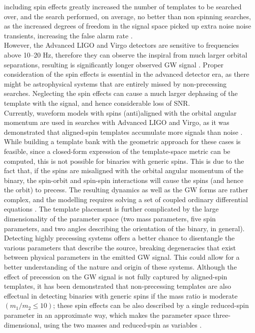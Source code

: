 \documentclass[binding=0.6cm, LaM]{sapthesis}
\begin{document}
	including spin effects greatly increased the number of templates to be searched over, 
	and the search performed, on average, no better than non spinning searches, 	
	as the increased degrees of freedom in the signal space picked up extra noise noise transients, 	
	increasing the false alarm rate \cite{32, 38}. \\ 
	However, the Advanced LIGO and Virgo detectors are sensitive to frequencies above 10–20 Hz, 
	therefore they can observe the inspiral from much larger orbital separations, 
	resulting is significantly longer observed GW signal \cite{23}. 
	Proper consideration of the spin effects is essential in the advanced detector era, 
	as there might be astrophysical systems that are entirely missed by non-precessing searches.
	Neglecting the spin effects can cause a much larger dephasing of the template with the signal, 
	and hence considerable loss of SNR. \\
	Currently, waveform models with spins (anti)aligned with the orbital angular momentum 
	are used in searches with Advanced LIGO and Virgo, 
	as it was demonstrated that aligned-spin templates accumulate more signals than noise \cite{27}. 
	While building a template bank with the geometric approach for these cases is feasible, 
	since a closed-form expression of the template-space metric can be computed, 
	this is not possible for binaries with generic spins. 
	This is due to the fact that, 
	if the spins are misaligned with the orbital angular momentum of the binary, 
	the spin-orbit and spin-spin interactions will cause the spins 
	(and hence the orbit) to precess. 
	The resulting dynamics as well as the GW forms are rather complex, 
	and the modelling requires solving a set of coupled ordinary differential equations \cite{39}. 
	The template placement is further complicated by the large dimensionality of the parameter space 
	(two mass parameters, five spin parameters, and two angles describing the orientation of the binary, in general). 
	Detecting highly precessing systems offers a better chance to 
	disentangle the various parameters that describe the source,  
	breaking degeneracies that exist between physical parameters 
	in the emitted GW signal.  
	This could allow for a better understanding of the nature and origin of these systems.
	Although the effect of precession on the GW signal is not fully captured 
	by aligned-spin templates, it has been demonstrated that non-precessing templates 
	are also effectual in detecting binaries with generic spins if the mass ratio is moderate 
	$(m_1/m_2 \leq 10)$; these spin effects can be also described by 
	a single reduced-spin parameter in an approximate way, 
	which makes the parameter space three-dimensional, 
	using the two masses and reduced-spin as variables \cite{32}. 
	
\end{document}
